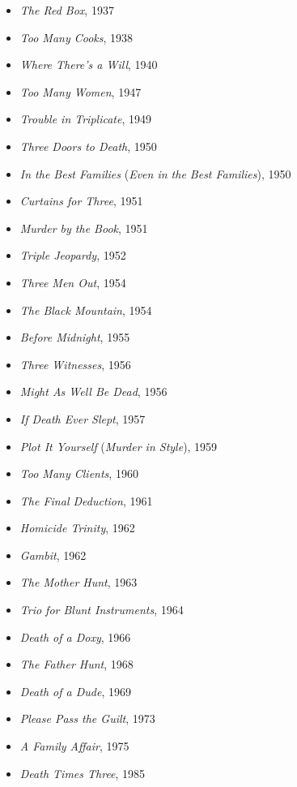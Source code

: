 \documentclass[twocolumn]{article}
\begin{document}
\begin{itemize}

\item \emph{The Red Box}, 1937
\item \emph{Too Many Cooks}, 1938
\item \emph{Where There's a Will}, 1940
\item \emph{Too Many Women}, 1947

\bigskip

\item \emph{Trouble in Triplicate}, 1949
\item \emph{Three Doors to Death}, 1950
\item \emph{In the Best Families} (\emph{Even in the Best Families}), 1950
\item \emph{Curtains for Three}, 1951
\item \emph{Murder by the Book}, 1951
\item \emph{Triple Jeopardy}, 1952
\item \emph{Three Men Out}, 1954
\item \emph{The Black Mountain}, 1954
\item \emph{Before Midnight}, 1955
\item \emph{Three Witnesses}, 1956
\item \emph{Might As Well Be Dead}, 1956
\item \emph{If Death Ever Slept}, 1957
\item \emph{Plot It Yourself} (\emph{Murder in Style}), 1959
\item \emph{Too Many Clients}, 1960
\item \emph{The Final Deduction}, 1961
\item \emph{Homicide Trinity}, 1962
\item \emph{Gambit}, 1962
\item \emph{The Mother Hunt}, 1963
\item \emph{Trio for Blunt Instruments}, 1964
\item \emph{Death of a Doxy}, 1966
\item \emph{The Father Hunt}, 1968
\item \emph{Death of a Dude}, 1969
\item \emph{Please Pass the Guilt}, 1973
\item \emph{A Family Affair}, 1975
\item \emph{Death Times Three}, 1985

\end{itemize}
\end{document}
